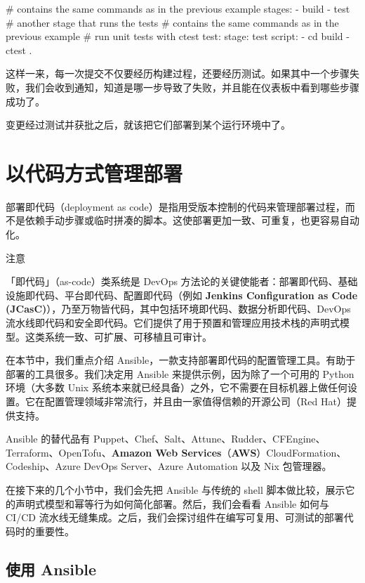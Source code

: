 \begin{codebox}[text]
# contains the same commands as in the previous example
stages:
  - build
  - test # another stage that runs the tests
# contains the same commands as in the previous example
# run unit tests with ctest
test:
  stage: test
  script:
    - cd build
    - ctest .
\end{codebox}

这样一来，每一次提交不仅要经历构建过程，还要经历测试。如果其中一个步骤失败，我们会收到通知，知道是哪一步导致了失败，并且能在仪表板中看到哪些步骤成功了。

变更经过测试并获批之后，就该把它们部署到某个运行环境中了。

\section{以代码方式管理部署}

\label{idx:935}
\label{idx:936}
部署即代码（deployment as code）是指用受版本控制的代码来管理部署过程，而不是依赖手动步骤或临时拼凑的脚本。这使部署更加一致、可重复，也更容易自动化。

\begin{myNotic}{注意}

\label{idx:937}
「即代码」（as-code）类系统是 DevOps 方法论的关键使能者：部署即代码、基础设施即代码、平台即代码、配置即代码（例如 \textbf{Jenkins Configuration as Code (JCasC)}），乃至万物皆代码，其中包括环境即代码、数据分析即代码、DevOps 流水线即代码和安全即代码。它们提供了用于预置和管理应用技术栈的声明式模型。这类系统一致、可扩展、可移植且可审计。
\end{myNotic}

\label{idx:938}
在本节中，我们重点介绍 Ansible，一款支持部署即代码的配置管理工具。有助于部署的工具很多。我们决定用 Ansible 来提供示例，因为除了一个可用的 Python 环境（大多数 Unix 系统本来就已经具备）之外，它不需要在目标机器上做任何设置。它在配置管理领域非常流行，并且由一家值得信赖的开源公司（Red Hat）提供支持。

Ansible 的替代品有 Puppet、Chef、Salt、Attune、Rudder、CFEngine、Terraform、OpenTofu、\textbf{Amazon Web Services}（\textbf{AWS}）CloudFormation、Codeship、Azure DevOps Server、Azure Automation 以及 Nix 包管理器。

在接下来的几个小节中，我们会先把 Ansible 与传统的 shell 脚本做比较，展示它的声明式模型和幂等行为如何简化部署。然后，我们会看看 Ansible 如何与 CI/CD 流水线无缝集成。之后，我们会探讨组件在编写可复用、可测试的部署代码时的重要性。

\subsection{使用 Ansible}

